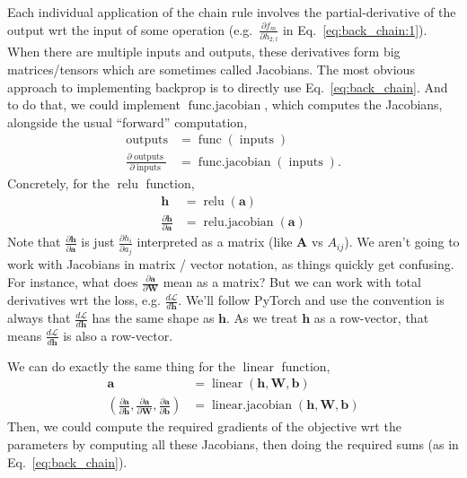 \documentclass{article}
\newcommand{\dd}[2][]{\frac{\partial #1}{\partial #2}}
\newcommand{\dt}[2][]{\frac{d #1}{d #2}}
\newcommand{\dL}{\dt[\L]}
\newcommand{\bracket}[3]{\left#1 #3 \right#2}
\renewcommand{\b}{\bracket{(}{)}}
\newcommand{\h}{\mathbf{h}}
\newcommand{\bv}{\mathbf{b}}
\renewcommand{\a}{\mathbf{a}}
\newcommand{\W}{\mathbf{W}}
\renewcommand{\L}{\mathcal{L}}
\newcommand{\linear}{\operatorname{linear}}
\newcommand{\relu}{\operatorname{relu}}
\newcommand{\func}{\operatorname{func}}
\newcommand{\funcjac}{\operatorname{func{.}jacobian}}
\newcommand{\inputs}{\operatorname{inputs}}
\newcommand{\outputs}{\operatorname{outputs}}
\newcommand{\linearjac}{\operatorname{linear{.}jacobian}}
\newcommand{\relujac}{\operatorname{relu{.}jacobian}}
\begin{document}
Each individual application of the chain rule involves the partial-derivative of the output wrt the input of some operation (e.g.\ $\dd[f_m]{h_{2;l}}$ in Eq.~\ref{eq:back_chain:1}).
When there are multiple inputs and outputs, these derivatives form big matrices/tensors which are sometimes called Jacobians.
The most obvious approach to implementing backprop is to directly use Eq.~\eqref{eq:back_chain}.
And to do that, we could implement $\funcjac$, which computes the Jacobians, alongside the usual ``forward'' computation,
\begin{subequations}
\label{eq:general_jacobian}
\begin{align}
  \outputs &= \func\b{\inputs}\\
  \dd[\outputs]{\inputs} &= \funcjac\b{\inputs}.
\end{align}
\end{subequations}
Concretely, for the $\relu$ function,
\begin{subequations}
\begin{align}
  \h &= \relu\b{\a} \\ 
  \dd[\h]{\a} &= \relujac\b{\a}
\end{align}
\end{subequations}
Note that $\dd[\h]{\a}$ is just $\dd[h_i]{a_j}$ interpreted as a matrix (like $\mathbf{A}$ vs $A_{ij}$).  
We aren't going to work with Jacobians in matrix / vector notation, as things quickly get confusing.
For instance, what does $\dd[\a]{\W}$ mean as a matrix?
But we can work with total derivatives wrt the loss, e.g. $\dL{\h}$.  
We'll follow PyTorch and use the convention is always that $\dL{\h}$ has the same shape as $\h$.
As we treat $\h$ as a row-vector, that means $\dL{\h}$ is also a row-vector.

We can do exactly the same thing for the $\linear$ function,
\begin{subequations}
\begin{align}
  \a &= \linear\b{\h, \W, \bv} \\ 
  \b{\dd[\a]{\h}, \dd[\a]{\W}, \dd[\a]{\bv}} &= \linearjac\b{\h, \W, \bv}
\end{align}
\end{subequations}
Then, we could compute the required gradients of the objective wrt the parameters by computing all these Jacobians, then doing the required sums (as in Eq.~\ref{eq:back_chain}).
\end{document}

